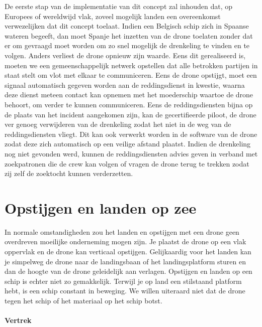 De eerste stap van de implementatie van dit concept zal inhouden dat, op Europees of wereldwijd vlak, zoveel mogelijk landen een overeenkomst verwezelijken dat dit concept toelaat. Indien een Belgisch schip zich in Spaanse wateren begeeft, dan moet Spanje het inzetten van de drone toelaten zonder dat er om gevraagd moet worden om zo snel mogelijk de drenkeling te vinden en te volgen. Anders verliest de drone opnieuw zijn waarde.
Eens dit gerealiseerd is, moeten we een gemeenschappelijk netwerk opstellen dat alle betrokken partijen in staat stelt om vlot met elkaar te communiceren. Eens de drone opstijgt, moet een signaal automatisch gegeven worden aan de reddingsdienst in kwestie, waarna deze dienst meteen contact kan opnemen met het moederschip waartoe de drone behoort, om verder te kunnen communiceren. Eens de reddingsdiensten bijna op de plaats van het incident aangekomen zijn, kan de gecertifieerde piloot, de drone ver genoeg verwijderen van de drenkeling zodat het niet in de weg van de reddingsdiensten vliegt. Dit kan ook verwerkt worden in de software van de drone zodat deze zich automatisch op een veilige afstand plaatst. Indien de drenkeling nog niet gevonden werd, kunnen de reddingsdiensten advies geven in verband met zoekpatronen die de crew kan volgen of vragen de drone terug te trekken zodat zij zelf de zoektocht kunnen verderzetten.

\section{Opstijgen en landen op zee}

In normale omstandigheden zou het landen en opstijgen met een drone geen overdreven moeilijke onderneming mogen zijn. Je plaatst de drone op een vlak oppervlak en de drone kan verticaal opstijgen. Gelijkaardig voor het landen kan je simpelweg de drone naar de landingsbaan of het landingsplatform sturen en dan de hoogte van de drone geleidelijk aan verlagen. Opstijgen en landen op een schip is echter niet zo gemakkelijk. Terwijl je op land een stilstaand platform hebt, is een schip constant in beweging. We willen uiteraard niet dat de drone tegen het schip of het materiaal op het schip botst. 

\paragraph{Vertrek}


